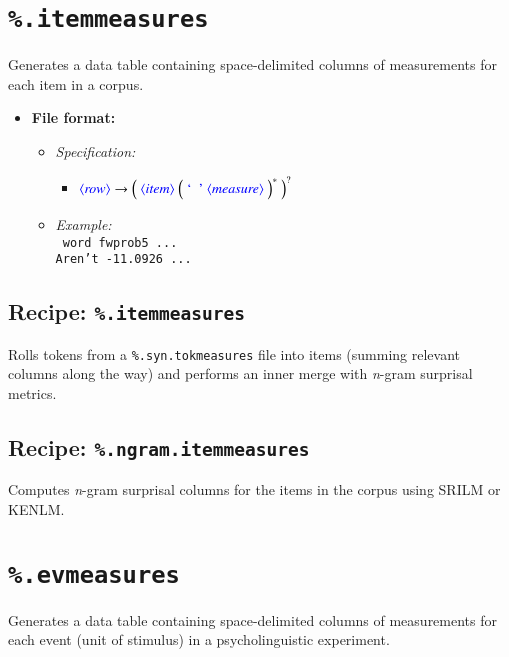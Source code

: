 \documentclass[12pt]{report}
\def\blue{\color{blue}}
\def\magenta{\color{magenta}}
\begin{document}
\section{{\blue\tt \%.itemmeasures}}

Generates a data table containing space-delimited columns of measurements for each item in a corpus.

\begin{itemize}
      \item \textbf{File format:}
      \begin{itemize}
            \item \textit{Specification:}\\
                  \begin{itemize}
                  \item $\dtype{row} \rightarrow \Big( \ \dtype{item} \ \Big( \ \dcode{\ } \ \dtype{measure} \ \Big)^* \ \Big)^?$
                  \end{itemize}
            \item \textit{Example:}\\
                  {\magenta\tt
                  word fwprob5 ...\\
                  Aren't -11.0926 ...\\
                  }
      \end{itemize}
\end{itemize}

\subsection{Recipe: \blue\tt \%.itemmeasures}
Rolls tokens from a {\tt\blue \%.syn.tokmeasures} file into items (summing relevant columns along the way) and performs an inner merge with \textit{n}-gram surprisal metrics.

\subsection{Recipe: \blue\tt \%.ngram.itemmeasures}
Computes \textit{n}-gram surprisal columns for the items in the corpus using SRILM or KENLM.


\section{{\blue\tt \%.evmeasures}}

Generates a data table containing space-delimited columns of measurements for each event (unit of stimulus) in a psycholinguistic experiment.
\end{document}

